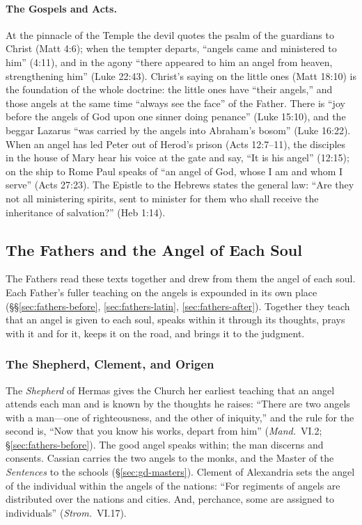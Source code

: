\paragraph{The Gospels and Acts.} At the pinnacle of the Temple the devil
quotes the psalm of the guardians to Christ (Matt 4:6); when the tempter
departs, ``angels came and ministered to him'' (4:11), and in the agony ``there
appeared to him an angel from heaven, strengthening him'' (Luke 22:43).
Christ's saying on the little ones (Matt 18:10) is the foundation of the whole
doctrine: the little ones have ``their angels,'' and those angels at the same
time ``always see the face'' of the Father. There is ``joy before the
angels of God upon one sinner doing penance'' (Luke 15:10), and the beggar
Lazarus ``was carried by the angels into Abraham's bosom'' (Luke 16:22). When
an angel has led Peter out of Herod's prison (Acts 12:7--11), the disciples in
the house of Mary hear his voice at the gate and say, ``It is his angel''
(12:15); on the ship to Rome Paul speaks of ``an angel of God, whose I am and
whom I serve'' (Acts 27:23). The Epistle to the Hebrews states the general
law: ``Are they not all ministering spirits, sent to minister for them who
shall receive the inheritance of salvation?'' (Heb 1:14).

\sectionguard
\subsection{The Fathers and the Angel of Each Soul}\label{sec:gd-fathers}

The Fathers read these texts together and drew from them the angel of each
soul. Each Father's fuller teaching on the angels is expounded in its own
place (\S\S\ref{sec:fathers-before}, \ref{sec:fathers-latin},
\ref{sec:fathers-after}). Together they teach that an angel is given to each
soul, speaks within it through its thoughts, prays with it and for it, keeps
it on the road, and brings it to the judgment.

\subsubsection{The Shepherd, Clement, and Origen}

The \emph{Shepherd} of Hermas gives the Church her earliest teaching that an
angel attends each man and is known by the thoughts he raises: ``There are
two angels with a man---one of righteousness, and the other of iniquity,''
and the rule for the second is, ``Now that you know his works, depart from
him'' (\emph{Mand.}\ VI.2; \S\ref{sec:fathers-before}). The good angel speaks
within; the man discerns and consents. Cassian carries the two angels to the monks, and the
Master of the \emph{Sentences} to the schools (\S\ref{sec:gd-masters}).
Clement of Alexandria sets the angel of the individual within the angels of
the nations: ``For regiments of angels are distributed over the nations and
cities. And, perchance, some are assigned to individuals'' (\emph{Strom.}\
VI.17).

